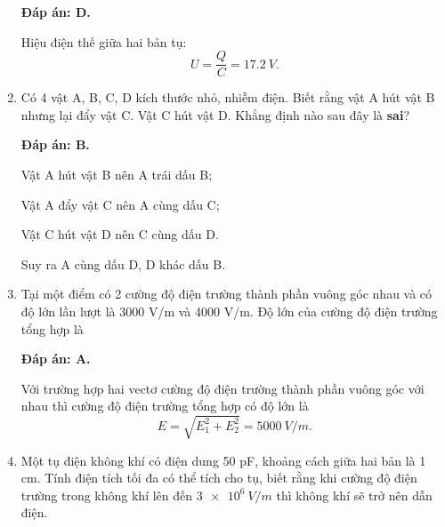 \begin{enumerate}[label=\bfseries Câu \arabic*:]
{	}
	\loigiai
	{	\textbf{Đáp án: D.}
		
		Hiệu điện thế giữa hai bản tụ:
		$$U=\dfrac{Q}{C} = \SI{17.2}{V}.$$
	}
	\item {}
	
	\cauhoi
	{Có 4 vật A, B, C, D kích thước nhỏ, nhiễm điện. Biết rằng vật A hút vật B nhưng lại đẩy vật C. Vật C hút vật D. Khẳng định nào sau đây là \textbf{sai}?
		
	}
	\loigiai
	{	\textbf{Đáp án: B.}
		
		Vật A hút vật B nên A trái dấu B;
		
		Vật A đẩy vật C nên A cùng dấu C;
		
		Vật C hút vật D nên C cùng dấu D.
		
		Suy ra A cùng dấu D, D khác dấu B.
	}
	\item {}
	
	\cauhoi
	{Tại một điểm có 2 cường độ điện trường thành phần vuông góc nhau và có độ lớn lần lượt là 3000 V/m và 4000 V/m. Độ lớn của cường độ điện trường tổng hợp là
		
	}
	\loigiai
	{	\textbf{Đáp án: A.}
		
		Với trường hợp hai vectơ cường độ điện trường thành phần vuông góc với nhau thì cường độ điện trường tổng hợp có độ lớn là
		$$E=\sqrt{E_1^2 + E_2^2} = \SI{5000}{V/m}.$$
	}
	\item {}
	
	\cauhoi
	{Một tụ điện không khí có điện dung 50 pF, khoảng cách giữa hai bản là 1 cm. Tính điện tích tối đa có thể tích cho tụ, biết rằng khi cường độ điện trường trong không khí lên đến $\SI{3e6}{V/m}$ thì không khí sẽ trở nên dẫn điện.
		
}
\end{enumerate}
